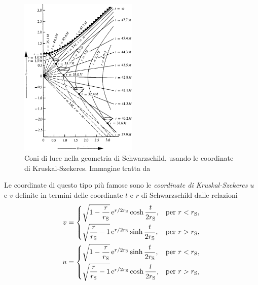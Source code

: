 \begin{figure}
  \centering
  \includegraphics[width=0.5\textwidth]{figure/kruskal}
  \caption[Coni di luce nella geometria di Schwarzschild, usando le coordinate
  di Kruskal-Szekeres]{Coni di luce nella geometria di Schwarzschild, usando le
    coordinate di Kruskal-Szekeres.  Immagine tratta
    da~\textcite[848]{misner:gravitation}}
  \label{fig:coni-kruskal}
\end{figure}
Le coordinate di questo tipo più famose sono le \emph{coordinate di
  Kruskal-Szekeres} \(u\) e \(v\) definite
in termini delle coordinate \(t\) e \(r\) di Schwarzschild dalle
relazioni~\parencites{1960PhRv..119.1743K}{1960PMatD...7..285S}
\begin{subequations}
  \allowdisplaybreaks{}
  \begin{align}
    v &=
    \begin{cases}
      \sqrt{1 - \dfrac{r}{r_{\textup{S}}}}\e^{r/2r_{\textup{S}}} \cosh
      \dfrac{t}{2r_{\textup{S}}}, & \text{per \(r < r_{\textup{S}}\),} \\[2.1ex]
      \sqrt{\dfrac{r}{r_{\textup{S}}} - 1}\e^{r/2r_{\textup{S}}} \sinh
      \dfrac{t}{2r_{\textup{S}}}, & \text{per \(r > r_{\textup{S}}\),}
    \end{cases} \\
    u &=
    \begin{cases}
      \sqrt{1 - \dfrac{r}{r_{\textup{S}}}}\e^{r/2r_{\textup{S}}} \sinh
      \dfrac{t}{2r_{\textup{S}}}, & \text{per \(r < r_{\textup{S}}\),} \\[2.1ex]
      \sqrt{\dfrac{r}{r_{\textup{S}}} - 1}\e^{r/2r_{\textup{S}}} \cosh
      \dfrac{t}{2r_{\textup{S}}}, & \text{per \(r > r_{\textup{S}}\),}
    \end{cases}
  \end{align}
\end{subequations}

